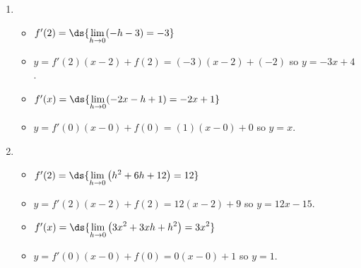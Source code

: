 \documentclass{ximera}
\begin{document}
\begin{enumerate}
\setcounter{enumi}{\value{HW}}

\item \begin{itemize}  \item $f'(2) = \ds{\lim_{h \rightarrow 0} (-h-3) = -3}$

\smallskip

\item  $y = f'(2)(x-2) + f(2) = (-3)(x-2)+(-2)$ so $y  = -3x+4$.

\smallskip

\item   $f'(x) =  \ds{\lim_{h \rightarrow 0} (-2x-h+1) = -2x+1}$ 

\smallskip

\item  $y = f'(0)(x-0) + f(0) = (1)(x-0) + 0$ so $y = x$.

\smallskip

\end{itemize}

\item \begin{itemize}

\item $f'(2) = \ds{\lim_{h \rightarrow 0} \left( h^2+6h+12 \right) = 12}$

\smallskip

\item  $y = f'(2)(x-2) + f(2) = 12(x-2)+ 9$ so $y = 12x - 15$.

\smallskip

\item  $f'(x) = \ds{\lim_{h \rightarrow 0} \left(3x^{2} + 3xh + h^{2} \right) = 3x^{2}}$ 

\smallskip

\item $y = f'(0)(x-0)+f(0) = 0(x-0)+1$ so $y = 1$.

\smallskip

\end{itemize} 

\setcounter{HW}{\value{enumi}}
\end{enumerate}
\end{document}
